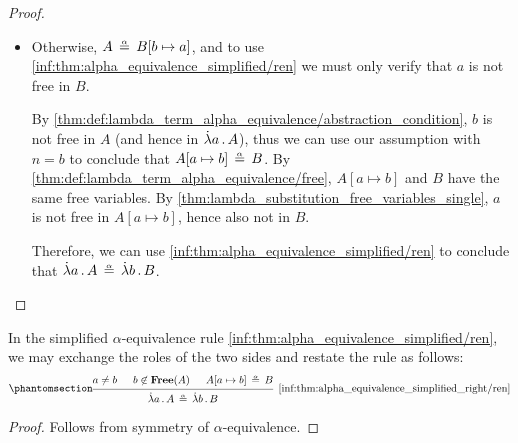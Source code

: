 \begin{proof}
\begin{itemize}
    \item Otherwise, \( A \aequiv B[b \mapsto a] \), and to use \ref{inf:thm:alpha_equivalence_simplified/ren} we must only verify that \( a \) is not free in \( B \).

    By \cref{thm:def:lambda_term_alpha_equivalence/abstraction_condition}, \( b \) is not free in \( A \) (and hence in \( \qabs a A \)), thus we can use our assumption with \( n = b \) to conclude that \( A[a \mapsto b] \aequiv B \). By \cref{thm:def:lambda_term_alpha_equivalence/free}, \( A[a \mapsto b] \) and \( B \) have the same free variables. By \cref{thm:lambda_substitution_free_variables_single}, \( a \) is not free in \( A[a \mapsto b] \), hence also not in \( B \).

    Therefore, we can use \ref{inf:thm:alpha_equivalence_simplified/ren} to conclude that \( \qabs a A \aequiv \qabs b B \).
  \end{itemize}
\end{proof}

\begin{proposition}\label{thm:alpha_equivalence_simplified_right}
  In the simplified \( \alpha \)-equivalence rule \ref{inf:thm:alpha_equivalence_simplified/ren}, we may exchange the roles of the two sides and restate the rule as follows:
  \begin{equation*}\taglabel[\ensuremath{ \logic{Ren}_\alpha^{\logic{r}} }]{inf:thm:alpha_equivalence_simplified_right/ren}
    \begin{prooftree}
      \hypo{ a \neq b }
      \hypo{ b \not\in \op*{Free}(A) }
      \hypo{ A[a \mapsto b] \aequiv B }
      \infer3[\ref{inf:thm:alpha_equivalence_simplified_right/ren}]{ \qabs a A \aequiv \qabs b B }
    \end{prooftree}
  \end{equation*}
\end{proposition}
\begin{proof}
  Follows from symmetry of \( \alpha \)-equivalence.
\end{proof}

